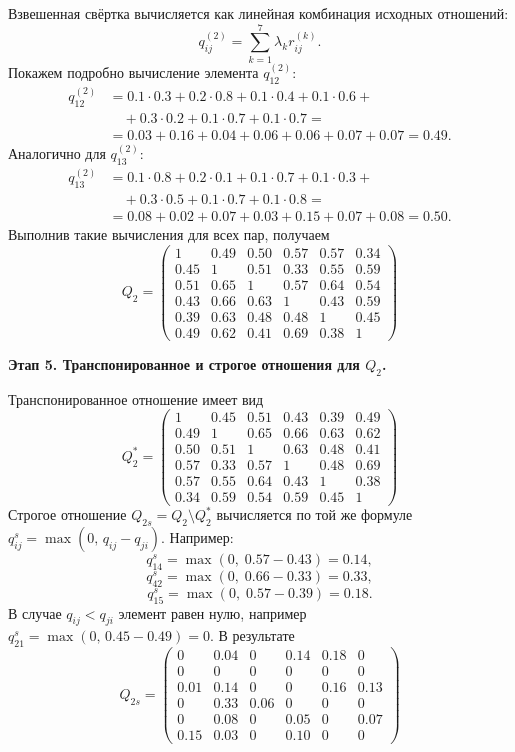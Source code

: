 Взвешенная свёртка вычисляется как линейная комбинация исходных отношений:
\[
q^{(2)}_{ij} = \sum_{k=1}^{7} \lambda_k r^{(k)}_{ij}.
\]
Покажем подробно вычисление элемента $q^{(2)}_{12}$:
\[
\begin{aligned}
q^{(2)}_{12} &= 0.1 \cdot 0.3 + 0.2 \cdot 0.8 + 0.1 \cdot 0.4 + 0.1 \cdot 0.6 + \\
&\quad + 0.3 \cdot 0.2 + 0.1 \cdot 0.7 + 0.1 \cdot 0.7 = \\
&= 0.03 + 0.16 + 0.04 + 0.06 + 0.06 + 0.07 + 0.07 = 0.49.
\end{aligned}
\]
Аналогично для $q^{(2)}_{13}$:
\[
\begin{aligned}
q^{(2)}_{13} &= 0.1 \cdot 0.8 + 0.2 \cdot 0.1 + 0.1 \cdot 0.7 + 0.1 \cdot 0.3 +\\
&\quad + 0.3 \cdot 0.5 + 0.1 \cdot 0.7 + 0.1 \cdot 0.8 = \\
&= 0.08 + 0.02 + 0.07 + 0.03 + 0.15 + 0.07 + 0.08 = 0.50.
\end{aligned}
\]
Выполнив такие вычисления для всех пар, получаем
\[
Q_2 = \begin{pmatrix}
1 & 0.49 & 0.50 & 0.57 & 0.57 & 0.34 \\
0.45 & 1 & 0.51 & 0.33 & 0.55 & 0.59 \\
0.51 & 0.65 & 1 & 0.57 & 0.64 & 0.54 \\
0.43 & 0.66 & 0.63 & 1 & 0.43 & 0.59 \\
0.39 & 0.63 & 0.48 & 0.48 & 1 & 0.45 \\
0.49 & 0.62 & 0.41 & 0.69 & 0.38 & 1
\end{pmatrix}
\]


\textbf{Этап 5. Транспонированное и строгое отношения для $Q_2$.}

Транспонированное отношение имеет вид
\[
Q_2^{*} = \begin{pmatrix}
1 & 0.45 & 0.51 & 0.43 & 0.39 & 0.49 \\
0.49 & 1 & 0.65 & 0.66 & 0.63 & 0.62 \\
0.50 & 0.51 & 1 & 0.63 & 0.48 & 0.41 \\
0.57 & 0.33 & 0.57 & 1 & 0.48 & 0.69 \\
0.57 & 0.55 & 0.64 & 0.43 & 1 & 0.38 \\
0.34 & 0.59 & 0.54 & 0.59 & 0.45 & 1
\end{pmatrix}
\]
Строгое отношение $Q_{2s} = Q_2 \setminus Q_2^{*}$ вычисляется по той же формуле $q^{s}_{ij} = \max(0,\,q_{ij}-q_{ji})$. Например:
\[
q^{s}_{14} = \max(0,\; 0.57 - 0.43) = 0.14,
\]
\[
q^{s}_{42} = \max(0,\; 0.66 - 0.33) = 0.33,
\]
\[
q^{s}_{15} = \max(0,\; 0.57 - 0.39) = 0.18.
\]
В случае $q_{ij} < q_{ji}$ элемент равен нулю, например $q^{s}_{21} = \max(0,\,0.45-0.49) = 0$. В результате
\[
Q_{2s} = \begin{pmatrix}
0 & 0.04 & 0 & 0.14 & 0.18 & 0 \\
0 & 0 & 0 & 0 & 0 & 0 \\
0.01 & 0.14 & 0 & 0 & 0.16 & 0.13 \\
0 & 0.33 & 0.06 & 0 & 0 & 0 \\
0 & 0.08 & 0 & 0.05 & 0 & 0.07 \\
0.15 & 0.03 & 0 & 0.10 & 0 & 0
\end{pmatrix}
\]

